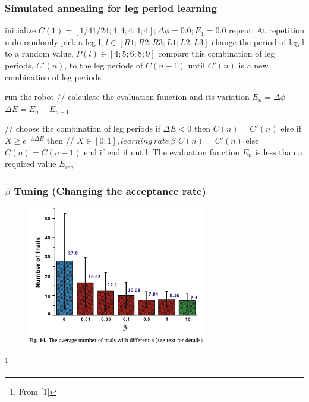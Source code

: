 \documentclass{beamer}
\begin{document}
\begin{frame}[fragile]
\frametitle{Simulated annealing for leg period learning}
\begin{algorithm}[mathescape]
initialize $C(1)= [1/4 1/24; 4; 4; 4; 4; 4]; \Delta\phi= 0.0; E_1 = 0.0$
repeat:
    At repetition n
    do
        randomly pick a leg l, $l \in [R1; R2; R3; L1; L2; L3]$
        change the period of leg l to a random value, $P(l) \in [4; 5; 6; 8; 9]$
        compare this combination of leg periods, $C'(n)$, to the leg periods of $C(n-1)$
    until $C'(n)$ is a new combination of leg periods
    
    run the robot
    // calculate the evaluation function and its variation
    $E_n = \Delta\phi$
    $\Delta E = E_n - E_{n-1}$
    
    // choose the combination of leg periods
    if $\Delta E < 0$ then
        $C(n) = C'(n)$
    else
        if  $X \geq e^{-\beta \Delta E}$ then // $X \in [0;1], learning~rate~\beta$ 
            $C(n) = C'(n)$
        else
            $C(n) = C(n - 1)$
        end if
    end if
until: The evaluation function $E_n$ is less than a required value $E_{req}$
\end{algorithm}
\end{frame}

\begin{frame}
\frametitle{$\beta$ Tuning (Changing the acceptance rate)}
\begin{figure}
\center
\includegraphics[width=0.7\textwidth]{figs/beta-tuning.pdf}
\end{figure}
\footnote{From [1]}
\end{frame}
\end{document}
